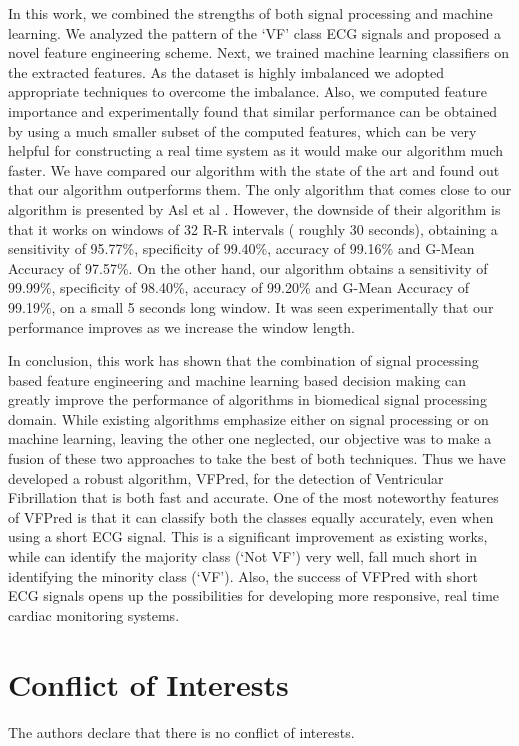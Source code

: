 \documentclass[12pt,a4paper]{article}
\begin{document}
In this work, we combined the strengths of both signal processing and machine learning. We analyzed the pattern of the `VF' class ECG signals and proposed a novel feature engineering scheme. Next, we trained machine learning classifiers on the extracted features. As the dataset is highly imbalanced we adopted appropriate techniques to overcome the imbalance. Also, we computed feature importance and experimentally found that similar performance can be obtained by using a much smaller subset of the computed features, which can be very helpful for constructing a real time system as it would make our algorithm much faster. We have compared our algorithm with the state of the art and found out that our algorithm outperforms them. The only algorithm that comes close to our algorithm is presented by Asl et al \cite{asl2008support}. However, the downside of their algorithm is that it works on windows of 32 R-R intervals ( roughly 30 seconds), obtaining a sensitivity of 95.77\%, specificity of 99.40\%, accuracy of 99.16\% and G-Mean Accuracy of 97.57\%. On the other hand, our algorithm obtains a sensitivity of 99.99\%, specificity of 98.40\%, accuracy of 99.20\% and G-Mean Accuracy of 99.19\%, on a small 5 seconds long window. It was seen experimentally that our performance improves as we increase the window length.

In conclusion, this work has shown that the combination of signal processing based feature engineering and machine learning based decision making can greatly improve the performance of algorithms in biomedical signal processing domain. While existing algorithms emphasize either on signal processing or on machine learning, leaving the other one neglected, our objective was to make a fusion of these two approaches to take the best of both techniques. Thus we have developed a robust algorithm, VFPred, for the detection of Ventricular Fibrillation that is both fast and accurate. One of the most noteworthy features of VFPred is that it can classify both the classes equally accurately, even when using a short ECG signal. This is a significant improvement as existing works, while can identify the majority class (`Not VF') very well, fall much short in identifying the minority class (`VF'). Also, the success of VFPred with short ECG signals opens up the possibilities for developing more responsive, real time cardiac monitoring systems.


\section{Conflict of Interests}
The authors declare that there is no conflict of interests.
\end{document}
